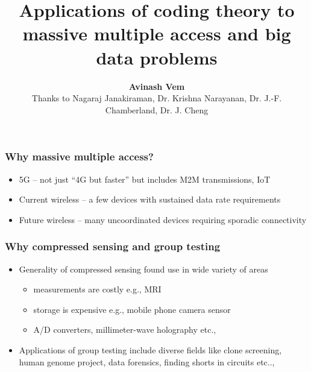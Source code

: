 \documentclass[10pt,usenames,dvipsnames]{beamer}
\def\figpath{../Figures}
\def\mac_figpath{../Figures/MAC}
\begin{document}
\title{\bf Applications of coding theory to massive multiple access and big data problems}
\author{\textbf{Avinash Vem}\\ \vspace{3pt} \small Thanks to Nagaraj Janakiraman, Dr. Krishna Narayanan, Dr. J.-F. Chamberland, Dr. J. Cheng} 
\vspace{4ex}
\date{} %


\frame{\titlepage}

\begin{frame}
\frametitle{Why massive multiple access?}

\begin{itemize}
\item 5G -- not just ``4G but faster'' but includes M2M transmissions, IoT
\item Current wireless -- a few devices with sustained data rate requirements
\item Future wireless -- {\color{blue}many uncoordinated} devices requiring {\color{blue}sporadic connectivity}
\end{itemize}



\end{frame}

\begin{frame}
\frametitle{Why compressed sensing and group testing}
\begin{itemize}
\setlength\itemsep{6pt}

	\item Generality of compressed sensing found use in wide variety of areas
	\begin{itemize}
	\setlength\itemsep{3pt}
 		\item measurements are costly e.g., MRI
		\item storage is expensive e.g., mobile phone camera sensor
		\item A/D converters, millimeter-wave holography etc.,
	\end{itemize}
	\item Applications of group testing include diverse fields like clone screening, human genome project, data forensics, finding shorts in circuits etc..,
\end{itemize}
\end{frame}
\end{document}
